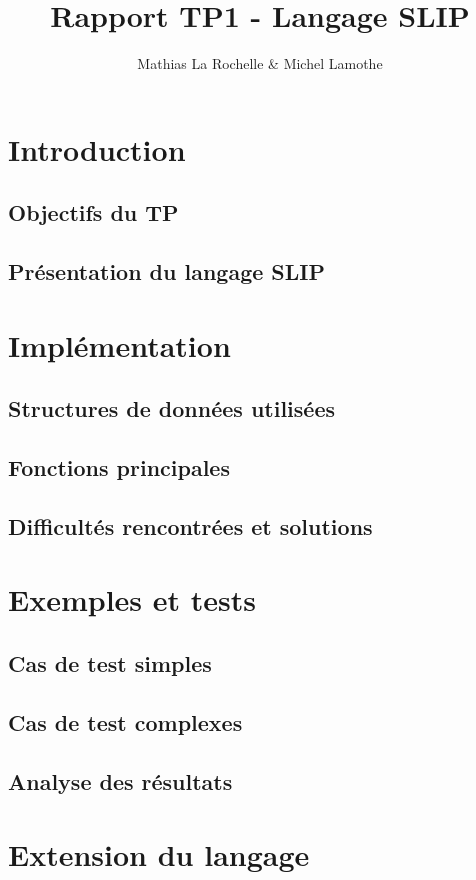 \documentclass{article}
\title{Rapport TP1 - Langage SLIP}
\author{Mathias La Rochelle \& Michel Lamothe}
\date{}
\begin{document}
\maketitle

\section{Introduction}
\subsection{Objectifs du TP}
\subsection{Présentation du langage SLIP}

\section{Implémentation}
\subsection{Structures de données utilisées}
\subsection{Fonctions principales}
\subsection{Difficultés rencontrées et solutions}

\section{Exemples et tests}
\subsection{Cas de test simples}
\subsection{Cas de test complexes}
\subsection{Analyse des résultats}

\section{Extension du langage}
\end{document}
